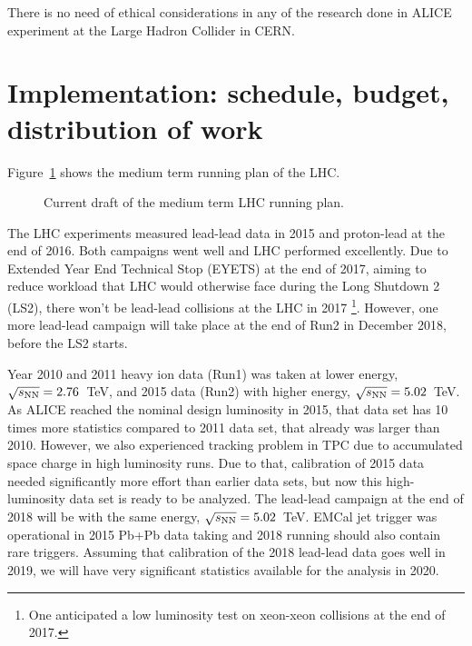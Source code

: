 There is no need of ethical considerations in any of the research done in ALICE experiment at the Large Hadron Collider in CERN.


\section{Implementation: schedule, budget, distribution of work} %
\label{sec:implementation}

Figure~\ref{fig:LHC-mid-term} shows the medium term running plan of the LHC. 
\begin{figure}[htbp]
   \centering
   \caption{Current draft of the medium term LHC running plan.}
   \label{fig:LHC-mid-term}
\end{figure}
The LHC experiments measured lead-lead data in 2015 and proton-lead at the end of 2016. Both campaigns went well and LHC performed excellently. Due to Extended Year End Technical Stop (EYETS) at the end of 2017, aiming to reduce workload that LHC would otherwise face during the Long Shutdown 2 (LS2), there won't be lead-lead collisions at the LHC in 2017 \footnote{One anticipated a low luminosity test on xeon-xeon collisions at the end of 2017.}. However, one more lead-lead campaign will take place at the end of Run2 in December 2018, before the LS2 starts.

Year 2010 and 2011 heavy ion data (Run1) was taken at lower energy, $\sqrt{s_{\rm NN}}=2.76$~TeV, and 2015 data (Run2) with higher energy, $\sqrt{s_{\rm NN}}=5.02$~TeV. As ALICE reached the nominal design luminosity in 2015, that data set has 10 times more statistics compared to 2011 data set, that already was larger than 2010. However, we also experienced tracking problem in TPC due to accumulated space charge in high luminosity runs. Due to that, calibration of 2015 data needed significantly more effort than earlier data sets, but now this high-luminosity data set is ready to be analyzed. The lead-lead campaign at the end of 2018 will be with the same energy, $\sqrt{s_{\rm NN}}=5.02$~TeV. EMCal jet trigger was operational in 2015 Pb+Pb data taking and 2018 running should also contain rare triggers. Assuming that calibration of the 2018 lead-lead data goes well in 2019, we will have very significant statistics available for the analysis in 2020.

